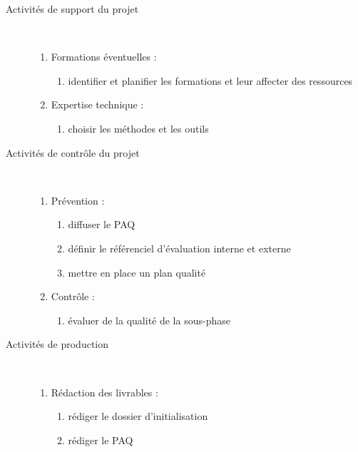 \begin{enumerate}
\begin{description}
      \item[Activités de support du projet] \hfill \\
          \begin{enumerate}
            \item Formations éventuelles :
                \begin{enumerate}
                  \item identifier et planifier les formations et leur affecter des ressources
                \end{enumerate}
            \item Expertise technique : 
                \begin{enumerate}
                  \item choisir les méthodes et les outils 
                \end{enumerate}
          \end{enumerate}

      \item[Activités de contrôle du projet] \hfill \\
          \begin{enumerate}
            \item Prévention :
                \begin{enumerate}
                  \item diffuser le PAQ 
                  \item définir le référenciel d'évaluation interne et externe 
                  \item mettre en place un plan qualité 
                \end{enumerate}
            \item Contrôle :
                \begin{enumerate}
                  \item évaluer de la qualité de la sous-phase
                \end{enumerate}
          \end{enumerate}

      \item[Activités de production] \hfill \\
          \begin{enumerate}
            \item Rédaction des livrables : 
                \begin{enumerate}
                  \item rédiger le dossier d'initialisation 
                  \item rédiger le PAQ 
                \end{enumerate}
          \end{enumerate}


\end{description}
\end{enumerate}
